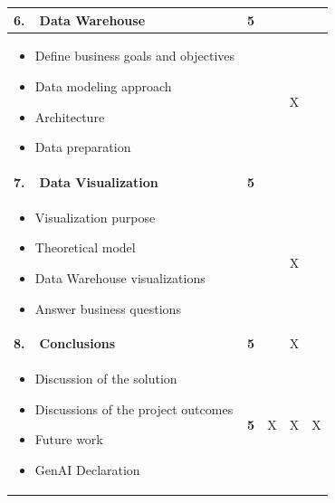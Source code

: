 \begin{table}[htbp]
\begin{tabular}{|L|P|C|C|C|}
\textbf{6.\ \ Data Warehouse} & \textbf{5} &  &  &  \\
\hline
\begin{minipage}[t]{\linewidth}\vspace{2pt}
\begin{itemize}[leftmargin=1.2em, nosep]
  \item Define business goals and objectives
  \item Data modeling approach
  \item Architecture
  \item Data preparation
\end{itemize}\vspace{2pt}
\end{minipage}
&  &  & X &  \\
\hline

\textbf{7.\ \ Data Visualization} & \textbf{5} &  &  &  \\
\hline
\begin{minipage}[t]{\linewidth}\vspace{2pt}
\begin{itemize}[leftmargin=1.2em, nosep]
  \item Visualization purpose
  \item Theoretical model
  \item Data Warehouse visualizations
  \item Answer business questions
\end{itemize}\vspace{2pt}
\end{minipage}
&  &  & X &  \\
\hline

\textbf{8.\ \ Conclusions} & \textbf{5} &  & X &  \\
\hline
\begin{minipage}[t]{\linewidth}\vspace{2pt}
\begin{itemize}[leftmargin=1.2em, nosep]
  \item Discussion of the solution
  \item Discussions of the project outcomes
  \item Future work
  \item GenAI Declaration
\end{itemize}\vspace{2pt}
\end{minipage}
& \textbf{5} & X & X & X \\
\hline

\end{tabular}
\end{table}




